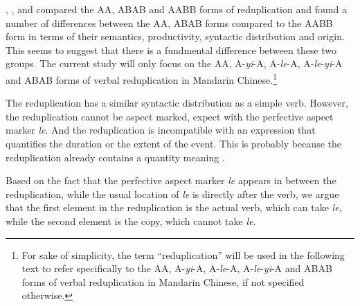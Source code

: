 \documentclass[
a4paper,
10pt,
oneside,
]{scrartcl}
\begin{document}
\citet{Arcodiaetal2014}, \citet{Fan1964}, \citet{MelloniBasciano2018} and \citet{Xie2020} compared the AA, ABAB and AABB forms of reduplication and found a number of differences between the AA, ABAB forms compared to the AABB form in terms of their semantics, productivity, syntactic distribution and origin. This seems to suggest that there is a fundmental difference between these two groups. The current study will only focus on the AA, A-\emph{yi}-A, A-\emph{le}-A, A-\emph{le}-\emph{yi}-A and ABAB forms of verbal reduplication in Mandarin Chinese.\footnote{For sake of simplicity, the term “reduplication” will be used in the following text to refer specifically to the AA, A-\emph{yi}-A, A-\emph{le}-A, A-\emph{le}-\emph{yi}-A and ABAB forms of verbal reduplication in Mandarin Chinese, if not specified otherwise.}

The reduplication has a similar syntactic distribution as a simple verb. However, the reduplication cannot be aspect marked, expect with the perfective aspect marker \emph{le}. And the reduplication is incompatible with an expression that quantifies the duration or the extent of the event. This is probably because the reduplication already contains a quantity meaning \citep{Li1998}.


Based on the fact that the perfective aspect marker \emph{le} appears in between the reduplication, while the usual location of \emph{le} is directly after the verb, we argue that the first element in the reduplication is the actual verb, which can take \emph{le}, while the second element is the copy, which cannot take \emph{le}.
\end{document}
